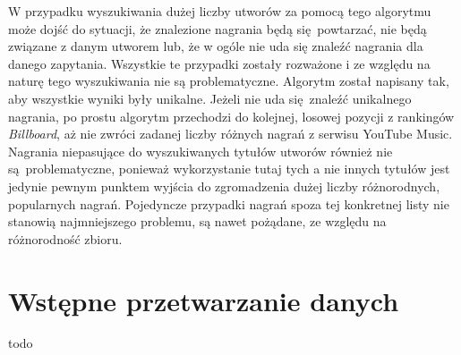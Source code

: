 W przypadku wyszukiwania dużej liczby utworów za pomocą tego algorytmu może dojść do sytuacji, że
znalezione nagrania będą się powtarzać, nie będą związane z danym utworem lub, że w ogóle nie uda
się znaleźć nagrania dla danego zapytania. Wszystkie te przypadki zostały rozważone i ze względu na
naturę tego wyszukiwania nie są problematyczne. Algorytm został napisany tak, aby wszystkie wyniki
były unikalne. Jeżeli nie uda się znaleźć unikalnego nagrania, po prostu algorytm przechodzi do
kolejnej, losowej pozycji z rankingów \emph{Billboard}, aż nie zwróci zadanej liczby różnych nagrań
z serwisu YouTube Music. Nagrania niepasujące do wyszukiwanych tytułów utworów również nie
są problematyczne, ponieważ wykorzystanie tutaj tych a nie innych tytułów jest jedynie pewnym
punktem wyjścia do zgromadzenia dużej liczby różnorodnych, popularnych nagrań. Pojedyncze przypadki
nagrań spoza tej konkretnej listy nie stanowią najmniejszego problemu, są nawet pożądane, ze względu
na różnorodność zbioru.

\section{Wstępne przetwarzanie danych}
todo

